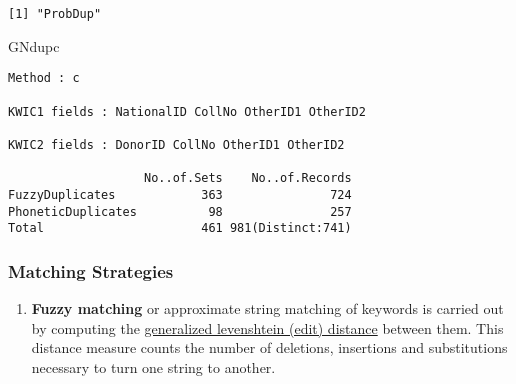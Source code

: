 \documentclass[]{article}
\newenvironment{Shaded}{\begin{snugshade}}{\end{snugshade}}
\newcommand{\NormalTok}[1]{#1}
\providecommand{\tightlist}{%
  \setlength{\itemsep}{0pt}\setlength{\parskip}{0pt}}
\begin{document}
\begin{verbatim}
[1] "ProbDup"
\end{verbatim}

\begin{Shaded}
\begin{Highlighting}[]
\NormalTok{GNdupc}
\end{Highlighting}
\end{Shaded}

\begin{verbatim}
Method : c

KWIC1 fields : NationalID CollNo OtherID1 OtherID2

KWIC2 fields : DonorID CollNo OtherID1 OtherID2
 
                   No..of.Sets    No..of.Records
FuzzyDuplicates            363               724
PhoneticDuplicates          98               257
Total                      461 981(Distinct:741)
\end{verbatim}

\hypertarget{matching-strategies}{%
\subsubsection{Matching Strategies}\label{matching-strategies}}

\begin{enumerate}
\def\labelenumi{\arabic{enumi}.}
\tightlist
\item
  \textbf{Fuzzy matching} or approximate string matching of keywords is
  carried out by computing the
  \href{https://en.wikipedia.org/wiki/Levenshtein_distance}{generalized
  levenshtein (edit) distance} between them. This distance measure
  counts the number of deletions, insertions and substitutions necessary
  to turn one string to another.
\end{enumerate}
\end{document}
